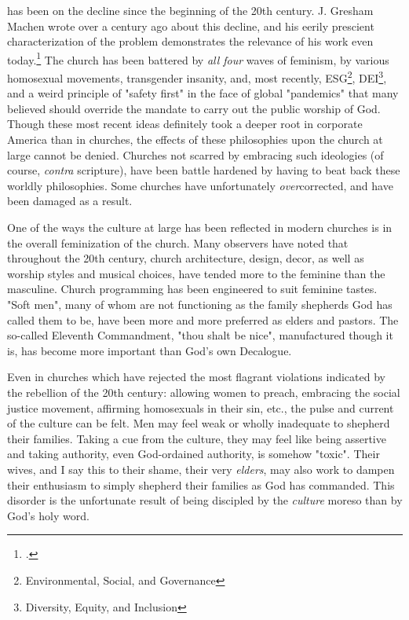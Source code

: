 \documentclass[justified, nobib]{tufte-handout}
\begin{document}
 has been on the decline since the beginning of the 20th century.  J. Gresham Machen wrote over a century ago about this decline, and his eerily prescient characterization of the problem demonstrates the relevance of his work even today.\footcite{machenchristianity}  The church has been battered by \textit{all four} waves of feminism, by various homosexual movements, transgender insanity, and, most recently, ESG\footnote{Environmental, Social, and Governance}, DEI\footnote{Diversity, Equity, and Inclusion}, and a weird principle of "safety first" in the face of global "pandemics" that many believed should override the mandate to carry out the public worship of God.  Though these most recent ideas definitely took a deeper root in corporate America than in churches, the effects of these philosophies upon the church at large cannot be denied.  Churches not scarred by embracing such ideologies (of course, \textit{contra} scripture), have been battle hardened by having to beat back these worldly philosophies.  Some churches have unfortunately \textit{over}corrected, and have been damaged as a result.

One of the ways the culture at large has been reflected in modern churches is in the overall feminization of the church.  Many observers have noted that throughout the 20th century, church architecture, design, decor, as well as worship styles and musical choices, have tended more to the feminine than the masculine.  Church programming has been engineered to suit feminine tastes.  "Soft men", many of whom are not functioning as the family shepherds God has called them to be, have been more and more preferred as elders and pastors.  The so-called Eleventh Commandment, "thou shalt be nice", manufactured though it is, has become more important than God's own Decalogue.  

Even in churches which have rejected the most flagrant violations indicated by the rebellion of the 20th century: allowing women to preach, embracing the social justice movement, affirming homosexuals in their sin, etc., the pulse and current of the culture can be felt.  Men may feel weak or wholly inadequate to shepherd their families.  Taking a cue from the culture, they may feel like being assertive and taking authority, even God-ordained authority, is somehow "toxic".  Their wives, and I say this to their shame, their very \textit{elders}, may also work to dampen their enthusiasm to simply shepherd their families as God has commanded.  This disorder is the unfortunate result of being discipled by the \textit{culture} moreso than by God's holy word.  
\end{document}
